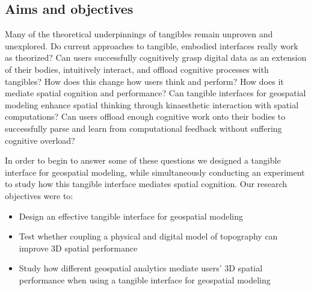 \documentclass[prodmode,acmtochi]{acmsmall} %
\begin{document}

\subsection{Aims and objectives}

Many of the theoretical underpinnings of tangibles 
remain unproven and unexplored. 
Do current approaches to tangible, embodied interfaces
really work as theorized? 
Can users successfully
cognitively grasp digital data as an extension of their bodies,
intuitively interact, 
and offload cognitive processes
with tangibles?
How does this change how users think and perform?
How does it mediate spatial cognition and performance? 
Can tangible interfaces for geospatial modeling 
enhance spatial thinking
through kinaesthetic interaction with 
spatial computations?
Can users offload enough cognitive work onto their bodies
to successfully parse and learn from computational feedback
without suffering cognitive overload?

In order to begin to answer some of these questions we 
designed a tangible interface for geospatial modeling, 
while simultaneously conducting an experiment
to study how this tangible interface mediates spatial cognition.
%
Our research objectives were to:
%
\begin{itemize}
\item Design an effective tangible interface for geospatial modeling
\item Test whether coupling a physical and digital model of topography can improve 3D spatial performance
\item Study how different geospatial analytics mediate users' 3D spatial performance when using a tangible interface for geospatial modeling
\end{itemize}
\end{document}
